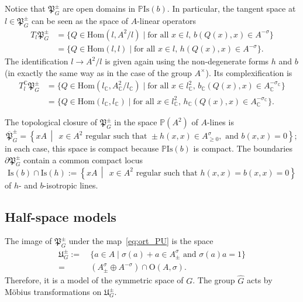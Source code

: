 \documentclass[oneside,11pt]{amsart}
\theoremstyle{definition}
\theoremstyle{remark}
\newcommand{\midwd}{\,\middle\vert\,}
\numberwithin{thm}{section}
\numberwithin{equation}{section}
\begin{document}
Notice that $\mathfrak{P}_G^\pm$ are open domains in $ \mathbb{P}\mathrm{Is}(b)$. In particular, the tangent space at $l\in\mathfrak{P}_G^\pm$ can be seen as the space of $A$-linear operators 
\begin{align*}
    T_l\mathfrak{P}_G^\pm&=\{Q\in\mathrm{Hom}(l,A^2/l)\mid \text{for all $x\in l$, }b(Q(x),x)\in A^{-\sigma}\}\\
    &=\{Q\in\mathrm{Hom}(l,l)\mid \text{for all $x\in l$, }h(Q(x),x)\in A^{-\sigma}\}.    
\end{align*}
The identification $l\to A^2/l$ is given again using the non-degenerate forms $h$ and $b$ (in exactly the same way as in the case of the group $A^\times$). Its complexification is 
\begin{align}\label{eq:O-proj-compl.tang}
    T^\mathbb C_l\mathfrak{P}_G^\pm&=\{Q\in\mathrm{Hom}(l_\mathbb C,A_{\mathbb C}^2/l_\mathbb C)\mid \text{for all $x\in l_\mathbb C^2$, }b_\mathbb C(Q(x),x)\in A_\mathbb C^{-\sigma_\mathbb C}\}\\
    &=\{Q\in\mathrm{Hom}(l_\mathbb C,l_\mathbb C)\mid \text{for all $x\in l_\mathbb C^2$, } h_\mathbb C(Q(x),x)\in A_\mathbb C^{-\sigma_\mathbb C}\}.    
\end{align}

\noindent The topological closure of $\mathfrak{P}_G^\pm$ in the space $\mathbb {P}(A^2)$ of $A$-lines is
$$\overline{\mathfrak{P}}_G^\pm=\left\{xA\midwd\; x\in A^{2}\text{ regular such that }\pm h(x,x)\in A^\sigma_{\geq 0},\text{ and }b(x,x)=0 \right\};$$
in each case, this space is compact because $\mathbb{P}\mathrm{Is}(b)$ is compact. The boundaries $\partial\mathfrak{P}_G^\pm$ contain a common compact locus 
\[\mathrm{Is}(b)\cap\mathrm{Is}(h):=\left\{xA\midwd\; x\in A^{2}\text{ regular such that }h(x,x)=b(x,x)=0 \right\}\] of $h$- and $b$-isotropic lines.

\subsection{Half-space models}\label{sec:halfspace_OC}

The image of $\mathfrak{P}_{G}^\pm$ under the map~\eqref{eq:ort_PU} is the space 
\begin{align*}
    \mathfrak{U}_G^\pm:=&\ \{a\in A\mid \sigma(a)+ a\in A^\sigma_\pm\text{ and }\sigma(a)a=1\}\\
    =& \ (A^{\sigma}_\pm\oplus A^{-\sigma})\cap \mathrm{O}(A,\sigma).
\end{align*}
Therefore, it is a model of the symmetric space of $G$. The group $\hat G$ acts by M\"obius transformations on $\mathfrak{U}_{G}^\pm$.
\end{document}
